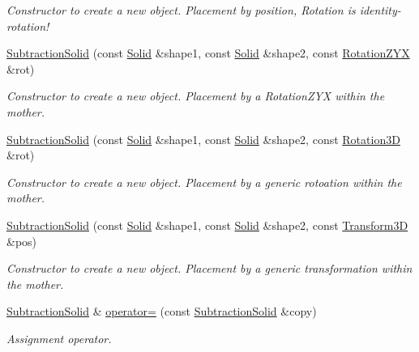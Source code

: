 \begin{DoxyCompactItemize}
\begin{DoxyCompactList}\small\item\em Constructor to create a new object. Placement by position, Rotation is identity-\/rotation! \item\end{DoxyCompactList}\item 
\hyperlink{class_d_d4hep_1_1_geometry_1_1_subtraction_solid_ac9c6a2de374c53eacf01eaa2ee759638}{SubtractionSolid} (const \hyperlink{class_d_d4hep_1_1_geometry_1_1_solid__type}{Solid} \&shape1, const \hyperlink{class_d_d4hep_1_1_geometry_1_1_solid__type}{Solid} \&shape2, const \hyperlink{namespace_d_d4hep_1_1_geometry_a24667b2b9c3cec3d5239828db4d52189}{RotationZYX} \&rot)
\begin{DoxyCompactList}\small\item\em Constructor to create a new object. Placement by a RotationZYX within the mother. \item\end{DoxyCompactList}\item 
\hyperlink{class_d_d4hep_1_1_geometry_1_1_subtraction_solid_a9ffb916760e748c1096ab8d765d7884a}{SubtractionSolid} (const \hyperlink{class_d_d4hep_1_1_geometry_1_1_solid__type}{Solid} \&shape1, const \hyperlink{class_d_d4hep_1_1_geometry_1_1_solid__type}{Solid} \&shape2, const \hyperlink{namespace_d_d4hep_1_1_geometry_a022fecb763315fa2bf39cbb648944a0e}{Rotation3D} \&rot)
\begin{DoxyCompactList}\small\item\em Constructor to create a new object. Placement by a generic rotoation within the mother. \item\end{DoxyCompactList}\item 
\hyperlink{class_d_d4hep_1_1_geometry_1_1_subtraction_solid_a3e6d305e752d6f429ddbe2f2a8a2f18d}{SubtractionSolid} (const \hyperlink{class_d_d4hep_1_1_geometry_1_1_solid__type}{Solid} \&shape1, const \hyperlink{class_d_d4hep_1_1_geometry_1_1_solid__type}{Solid} \&shape2, const \hyperlink{namespace_d_d4hep_1_1_geometry_aeb4c0356d12fd7be49a0aae50514e64b}{Transform3D} \&pos)
\begin{DoxyCompactList}\small\item\em Constructor to create a new object. Placement by a generic transformation within the mother. \item\end{DoxyCompactList}\item 
\hyperlink{class_d_d4hep_1_1_geometry_1_1_subtraction_solid}{SubtractionSolid} \& \hyperlink{class_d_d4hep_1_1_geometry_1_1_subtraction_solid_a6ee8427252bdb96e1549c59164ee4732}{operator=} (const \hyperlink{class_d_d4hep_1_1_geometry_1_1_subtraction_solid}{SubtractionSolid} \&copy)
\begin{DoxyCompactList}\small\item\em Assignment operator. \item\end{DoxyCompactList}\end{DoxyCompactItemize}


